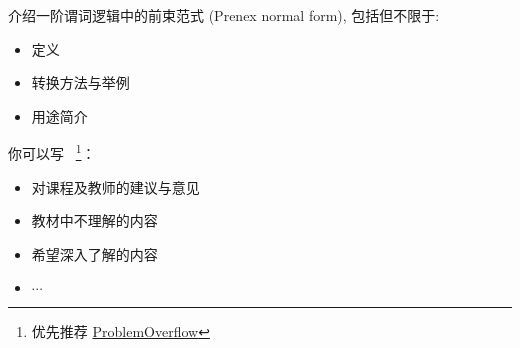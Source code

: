 \documentclass[a4paper, justified]{tufte-handout}
\begin{document}
\begin{solution}
\end{solution}

\begin{ot}[前束范式]
  介绍一阶谓词逻辑中的前束范式 (Prenex normal form), 包括但不限于:
  \begin{itemize}
    \item 定义
    \item 转换方法与举例
    \item 用途简介
  \end{itemize}
\end{ot}

\begin{solution}
\end{solution}

\begincorrection

\beginfb

你可以写
~\footnote{优先推荐 \href{problemoverflow.top}{ProblemOverflow}}：
\begin{itemize}
  \item 对课程及教师的建议与意见
  \item 教材中不理解的内容
  \item 希望深入了解的内容
  \item $\cdots$
\end{itemize}
\end{document}
